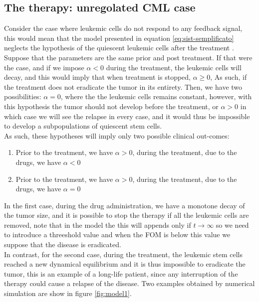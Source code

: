 \documentclass[a4paper,10pt]{article}
\begin{document}
\subsection{ The therapy: unregolated CML case}
Consider the case where leukemic cells do not respond to any feedback signal,
this would mean that
the model presented in equation 
\eqref{eq:sist-semplificato} neglects
the hypothesis of the quiescent leukemic cells after the treatment 
\cite{zhang2010effective, zhou2015leukemia, graham2002primitive,bruns2009hematopoietic}.
Suppose that the parameters are the same prior and post treatment.
If that were the case, and
if we impose $\alpha<0$ during the treatment, 
the leukemic cells will decay, and this would imply that when treatment is stopped,
$\alpha\geq 0$,
As such, if the treatment does not eradicate the tumor in its entirety.
Then, we have two possibilities:  $\alpha=0$, where the the leukemic cells remains constant, 
however, with this hypothesis
the tumor should not develop before the treatment, or $\alpha>0$  in which case
we will see the relapse in every case,
and it would thus be impossible to develop a subpopulations of quiescent stem cells.\\
As such, these hypotheses will imply only two possible clinical out-comes:
\begin{enumerate}
\item Prior to the treatment, we have $\alpha>0$,
during the treatment, due to the drugs, we have $\alpha<0$
\item Prior to the treatment, we have $\alpha>0$,
during the treatment, due to the drugs, we have $\alpha=0$
\end{enumerate}
In the first case, during the drug administration, we have a monotone decay of the tumor size,
and it is possible to stop the therapy if all the leukemic cells are removed, 
note that in the model the this will appends only if $t \to \infty$ so we need to introduce 
a threeshold value and when the FOM is below this value we suppose that the disease is eradicated.\\
In contrast,
for the second case, during the treatment, the leukemic stem cells
reached a new dynamical equilibrium 
and it is thus  impossible to 
eradicate the tumor, 
this is an example of a long-life patient, since any interruption 
of the therapy could cause a relapse of the disease.
Two examples obtained by numerical simulation
are show in figure \ref{fig:model1}.
\end{document}
